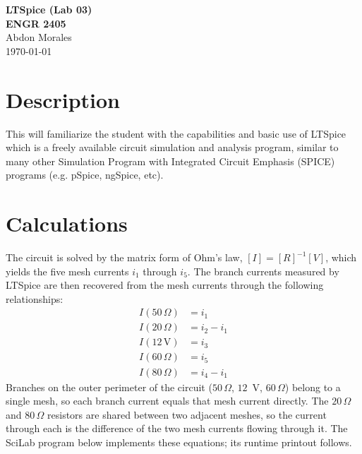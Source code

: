 \documentclass[11pt]{article}
\begin{document}
\begin{center}
    {\LARGE\bfseries LTSpice (Lab 03)\\ENGR 2405}\\[0.8em]
    {\large Abdon Morales}\\[0.3em]
    {\large \today}
\end{center}
\vspace{1em}

\section*{Description}

This will familiarize the student with the capabilities and basic use of LTSpice which is a freely
available circuit simulation and analysis program, similar to many other Simulation Program
with Integrated Circuit Emphasis (SPICE) programs (e.g. pSpice, ngSpice, etc).

\section*{Calculations}

The circuit is solved by the matrix form of Ohm's law, $[I] = [R]^{-1}[V]$,
which yields the five mesh currents $i_1$ through $i_5$. The branch currents
measured by LTSpice are then recovered from the mesh currents through the
following relationships:
%
\begin{align}
  I(50\,\Omega) &= i_1 \\
  I(20\,\Omega) &= i_2 - i_1 \\
  I(12\,\text{V}) &= i_3 \\
  I(60\,\Omega) &= i_5 \\
  I(80\,\Omega) &= i_4 - i_1
\end{align}
%
Branches on the outer perimeter of the circuit ($50\,\Omega$, $12$~V,
$60\,\Omega$) belong to a single mesh, so each branch current equals that mesh
current directly. The $20\,\Omega$ and $80\,\Omega$ resistors are shared between
two adjacent meshes, so the current through each is the difference of the two
mesh currents flowing through it. The SciLab program below implements these
equations; its runtime printout follows.
\end{document}
